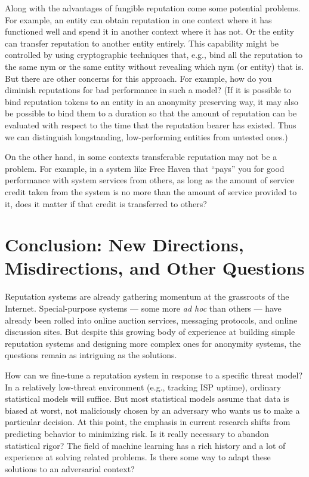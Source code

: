 \documentclass[times,10pt,twocolumn]{article}
\begin{document}
Along with the advantages of fungible reputation come some potential
problems. For example, an entity can obtain reputation in one context
where it has functioned well and spend it in another context where
it has not. Or the entity can transfer reputation to another entity
entirely. This capability might be controlled by using cryptographic
techniques that, e.g., bind all the reputation to the same nym or the
same entity without revealing which nym (or entity) that is. But there
are other concerns for this approach. For example, how do you diminish
reputations for bad performance in such a model? (If it is possible
to bind reputation tokens to an entity in an anonymity preserving way,
it may also be possible to bind them to a duration so that the amount of
reputation can be evaluated with respect to the time that the reputation
bearer has existed. Thus we can distinguish longstanding, low-performing
entities from untested ones.)

On the other hand, in some contexts transferable reputation may not be a
problem. For example, in a system like Free Haven that ``pays'' you for
good performance with system services from others, as long as the amount
of service credit taken from the system is no more than the amount of
service provided to it, does it matter if that credit is transferred
to others?

\section{Conclusion: New Directions, Misdirections, and Other Questions}

Reputation systems are already gathering momentum at the grassroots of the
Internet. Special-purpose systems --- some more {\it ad hoc} than others --- have
already been rolled into online auction services, messaging protocols, and
online discussion sites. But despite this growing body of experience at
building simple reputation systems and designing more complex ones for
anonymity systems, the questions remain as intriguing as the solutions.

How can we fine-tune a reputation system in response to a specific threat
model? In a relatively low-threat environment (e.g., tracking ISP uptime),
ordinary statistical models will suffice. But most statistical models
assume that data is biased at worst, not maliciously chosen by an adversary
who wants us to make a particular decision. At this point, the emphasis in
current research shifts from predicting behavior to minimizing risk. Is it
really necessary to abandon statistical rigor? The field of machine
learning has a rich history and a lot of experience at solving related
problems. Is there some way to adapt these solutions to an adversarial
context?
\end{document}
